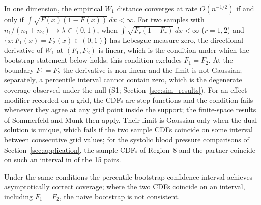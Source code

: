 \documentclass[AMA,Times1COL]{WileyNJDv5}
\begin{document}
In one dimension, the empirical $W_1$ distance converges at rate $O(n^{-1/2})$ if and only if $\int \sqrt{F(x)(1-F(x))}\,dx < \infty$.\cite{delbarrio1999} For two samples with $n_1/(n_1+n_2) \to \lambda \in (0,1)$, when $\int \sqrt{F_r(1-F_r)}\,dx < \infty$ ($r = 1, 2$) and $\{x : F_1(x) = F_2(x) \in (0,1)\}$ has Lebesgue measure zero, the directional derivative of $W_1$ at $(F_1, F_2)$ is linear, which is the condition under which the bootstrap statement below holds;\cite{fang2019} this condition excludes $F_1 = F_2$. At the boundary $F_1 = F_2$ the derivative is non-linear and the limit is not Gaussian; separately, a percentile interval cannot contain zero, which is the degenerate coverage observed under the null (S1; Section~\ref{sec:sim_results}). For an effect modifier recorded on a grid, the CDFs are step functions and the condition fails whenever they agree at any grid point inside the support; the finite-space results of Sommerfeld and Munk then apply.\cite{sommerfeld2018} Their limit is Gaussian only when the dual solution is unique, which fails if the two sample CDFs coincide on some interval between consecutive grid values; for the systolic blood pressure comparisons of Section~\ref{sec:application}, the sample CDFs of Region~8 and the partner coincide on such an interval in  of the 15 pairs.

Under the same conditions the percentile bootstrap confidence interval achieves asymptotically correct coverage;\cite{fang2019} where the two CDFs coincide on an interval, including $F_1 = F_2$, the naive bootstrap is not consistent.\cite{dumbgen1993,fang2019}

\end{document}
